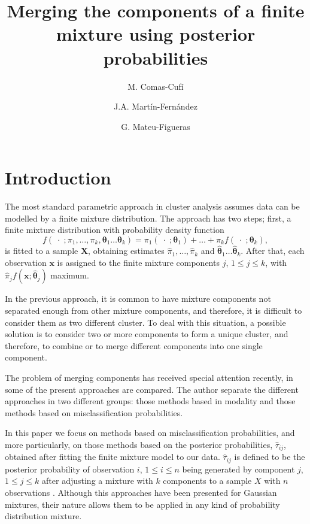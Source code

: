\documentclass[10pt, a4paper]{article}
\title{Merging the components of a finite mixture using  posterior probabilities}
\author{M. Comas-Cufí \and J.A. Martín-Fernández \and G. Mateu-Figueras}
\newcommand{\m}[1]{\boldsymbol{#1}}
\begin{document}
\maketitle

\section{Introduction}

The most standard parametric approach in cluster analysis assumes data can be modelled by a finite mixture distribution. The approach has two steps; first, a finite mixture distribution with probability density function
\[
f(\;\cdot\; ; \pi_1, \dots, \pi_k, \m\theta_1 \dots \m\theta_k) = \pi_1   (\;\cdot\; ; \m\theta_1) + \dots + \pi_k f(\;\cdot\; ; \m\theta_k),
\]%
is fitted to a sample $\m X$, obtaining estimates $\hat{\pi}_1, \dots, \hat{\pi}_k$ and $\hat{\m\theta}_1 \dots \hat{\m\theta}_k$. After that, each observation $\m x$ is assigned to the finite mixture components $j$, $1\leq j \leq k$, with $\hat{\pi}_j f(\m x ; \hat{\m\theta}_j)$ maximum. 

In the previous approach, it is common to have mixture components not separated enough from other mixture components, and therefore, it is difficult to consider them as two different cluster. To deal with this situation, a possible solution is to consider two or more components to form a unique cluster, and therefore, to combine or to merge different components into one single component.

The problem of merging components has received special attention recently, in \cite{hennig2010methods} some of the present approaches are compared. The author separate the different approaches in two different groups: those methods based in modality and those methods based on misclassification probabilities. 

In this paper we focus on methods based on misclassification probabilities, and more particularly, on those methods based on the posterior probabilities, $\hat{\tau}_{ij}$, obtained after fitting the finite mixture model to our data. $\hat{\tau}_{ij}$ is defined to be the posterior probability of observation $i$, $1 \leq i \leq n$ being generated by component $j$, $1\leq j\leq k$ after adjusting a mixture with $k$ components  to a sample $X$ with $n$ observations \citep{lognford2014,melnykov2013distribution,hennig2010methods,baudry2010combining}.  Although this approaches have been presented for Gaussian mixtures, their nature allows them to be applied in any kind of probability distribution mixture.
\end{document}
